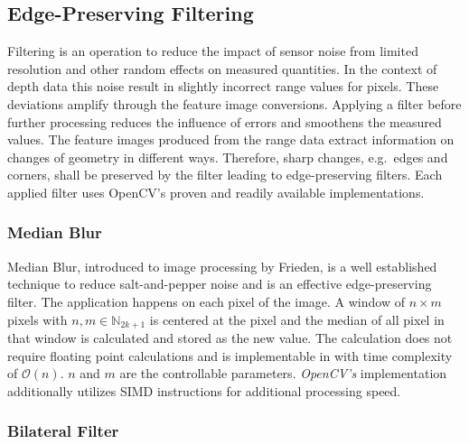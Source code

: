 \subsection{Edge-Preserving Filtering}

Filtering is an operation to reduce the impact of sensor noise from limited resolution and other random effects on measured quantities.
In the context of depth data this noise result in slightly incorrect range values for pixels.
These deviations amplify through the feature image conversions.
Applying a filter before further processing reduces the influence of errors and smoothens the measured values.
The feature images produced from the range data extract information on changes of geometry in different ways.
Therefore, sharp changes, e.g.~edges and corners, shall be preserved by the filter leading to edge-preserving filters.
Each applied filter uses OpenCV's\cite{opencv_library} proven and readily available implementations.

\subsubsection{Median Blur}

Median Blur, introduced to image processing by Frieden\cite{frieden_new76}, is a well established technique to reduce salt-and-pepper noise and is an effective edge-preserving filter.
The application happens on each pixel of the image.
A window of $n \times m$ pixels with $n,m \in \mathbb{N}_{2k + 1}$ is centered at the pixel and the median of all pixel in that window is calculated and stored as the new value.
The calculation does not require floating point calculations and is implementable in with time complexity of $\mathcal{O}(n)$\cite{huang_ieee79}.
$n$ and $m$ are the controllable parameters.
\emph{OpenCV's} implementation additionally utilizes \acrshort{SIMD} instructions for additional processing speed.

\subsubsection{Bilateral Filter}

